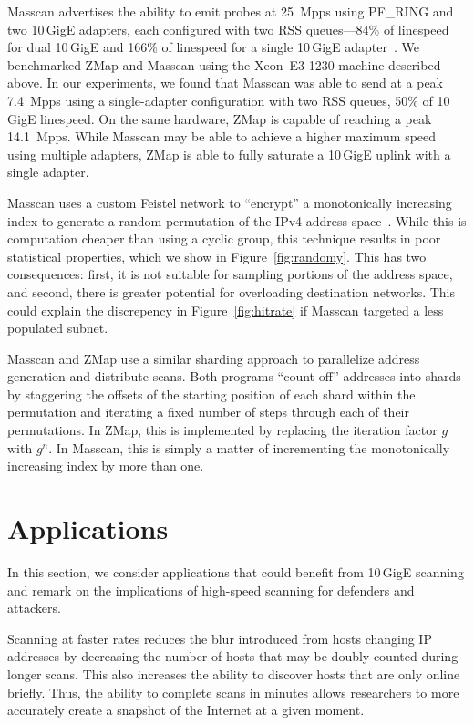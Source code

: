 Masscan advertises the ability to emit probes at 25~Mpps using PF\_RING and
two 10\,GigE adapters, each configured with two RSS queues---84\% of
linespeed for dual 10\,GigE and 166\% of linespeed for a single 10\,GigE
adapter~\cite{masscan-10g}. We benchmarked ZMap and Masscan using the
Xeon~E3-1230 machine described above. In our experiments, we found that
Masscan was able to send at a peak 7.4~Mpps using a single-adapter
configuration with two RSS queues, 50\% of 10\,GigE linespeed. On the same
hardware, ZMap is capable of reaching a peak 14.1~Mpps. While Masscan may be
able to achieve a higher maximum speed using multiple adapters, ZMap is able
to fully saturate a 10\,GigE uplink with a single adapter.

Masscan uses a custom Feistel network to ``encrypt'' a monotonically
increasing index to generate a random permutation of the IPv4 address
space~\cite{masscan-rng}. While this is computation cheaper than using a
cyclic group, this technique results in poor statistical properties, which we
show in Figure~\ref{fig:randomy}. This has two consequences: first, it is not
suitable for sampling portions of the address space, and second, there is
greater potential for overloading destination networks. This could explain
the discrepency in Figure~\ref{fig:hitrate} if Masscan targeted a less
populated subnet.

Masscan and ZMap use a similar sharding approach to parallelize address
generation and distribute scans. Both programs ``count off'' addresses into
shards by staggering the offsets of the starting position of each shard
within the permutation and iterating a fixed number of steps through each of
their permutations. In ZMap, this is implemented by replacing the iteration
factor $g$ with $g^n$. In Masscan, this is simply a matter of incrementing
the monotonically increasing index by more than one.


\section{Applications}
\label{sec:discussion}

In this section, we consider applications that could benefit from 10\,GigE
scanning and remark on the implications of high-speed scanning for defenders
and attackers.

Scanning at faster rates reduces the blur introduced from hosts changing IP
addresses by decreasing the number of hosts that may be doubly counted during
longer scans. This also increases the ability to discover hosts that are only
online briefly. Thus, the ability to complete scans in minutes allows
researchers to more accurately create a snapshot of the Internet at a given
moment.

